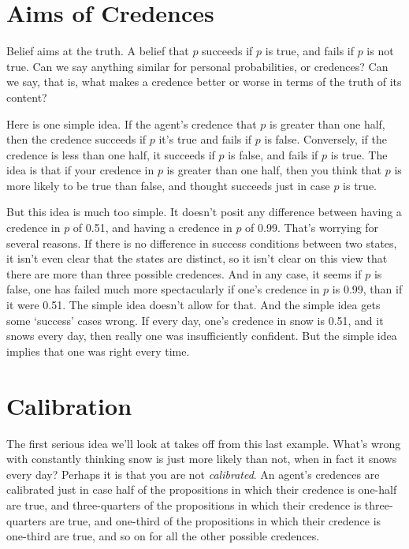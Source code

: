 \section{Aims of Credences}
Belief aims at the truth. A belief that $p$ succeeds if $p$ is true, and fails if $p$ is not true. Can we say anything similar for personal probabilities, or credences? Can we say, that is, what makes a credence better or worse in terms of the truth of its content?

Here is one simple idea. If the agent's credence that $p$ is greater than one half, then the credence succeeds if $p$ it's true and fails if $p$ is false. Conversely, if the credence is less than one half, it succeeds if $p$ is false, and fails if $p$ is true. The idea is that if your credence in $p$ is greater than one half, then you think that $p$ is more likely to be true than false, and thought succeeds just in case $p$ is true.

But this idea is much too simple. It doesn't posit any difference between having a credence in $p$ of 0.51, and having a credence in $p$ of 0.99. That's worrying for several reasons. If there is no difference in success conditions between two states, it isn't even clear that the states are distinct, so it isn't clear on this view that there are more than three possible credences. And in any case, it seems if $p$ is false, one has failed much more spectacularly if one's credence in $p$ is 0.99, than if it were 0.51. The simple idea doesn't allow for that. And the simple idea gets some `success' cases wrong. If every day, one's credence in snow is 0.51, and it snows every day, then really one was insufficiently confident. But the simple idea implies that one was right every time.

\section{Calibration}

The first serious idea we'll look at takes off from this last example. What's wrong with constantly thinking snow is just more likely than not, when in fact it snows every day? Perhaps it is that you are not \textit{calibrated}. An agent's credences are calibrated just in case half of the propositions in which their credence is one-half are true, and three-quarters of the propositions in which their credence is three-quarters are true, and one-third of the propositions in which their credence is one-third are true, and so on for all the other possible credences.

